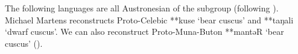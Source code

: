 The following languages are all Austronesian of the 
subgroup (following \citealp{Mead2003a,Zobel2020}).
Michael Martens reconstructs Proto-Celebic **kuse ‘bear cuscus’
and **taŋali ‘dwarf cuscus’.
We can also reconstruct Proto-Muna-Buton **mantəR ‘bear
cuscus’ ().

%

%
